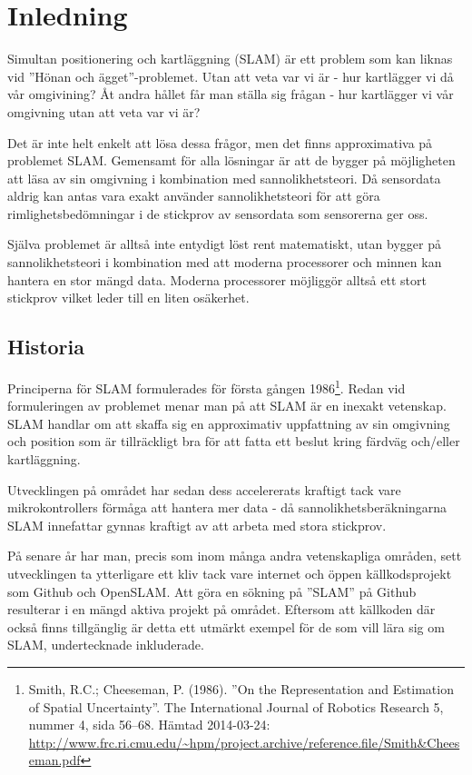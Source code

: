 \documentclass[a4paper,12pt,fleqn]{article} \usepackage{fixltx2e}
\begin{document}
\section{Inledning}

Simultan positionering och kartläggning (SLAM) är ett problem som kan liknas vid ''Hönan och ägget''-problemet. Utan att veta var vi är - hur kartlägger vi då vår omgivining? Åt andra hållet får man ställa sig frågan - hur kartlägger vi vår omgivning utan att veta var vi är? 

Det är inte helt enkelt att lösa dessa frågor, men det finns
approximativa på problemet SLAM. Gemensamt för alla lösningar är att de
bygger på möjligheten att läsa av sin omgivning i kombination med
sannolikhetsteori. Då sensordata aldrig kan antas vara exakt använder
sannolikhetsteori för att göra rimlighetsbedömningar i de stickprov av
sensordata som sensorerna ger oss.

Själva problemet är alltså inte entydigt löst rent matematiskt, utan
bygger på sannolikhetsteori i kombination med att moderna processorer
och minnen kan hantera en stor mängd data. Moderna processorer möjliggör
alltså ett stort stickprov vilket leder till en liten osäkerhet.

\subsection{Historia}

Principerna för SLAM formulerades för första gången 1986\footnote{Smith, R.C.; Cheeseman, P. (1986). ''On the Representation and Estimation of Spatial Uncertainty''. The International Journal of Robotics Research 5, nummer 4, sida 56–68. Hämtad 2014-03-24: \url{http://www.frc.ri.cmu.edu/~hpm/project.archive/reference.file/Smith&Cheeseman.pdf}}. Redan vid formuleringen av problemet menar man på att SLAM är en inexakt vetenskap. SLAM handlar om att skaffa sig en approximativ uppfattning av sin omgivning och position som är tillräckligt bra för att fatta ett beslut kring färdväg och/eller kartläggning. 

Utvecklingen på området har sedan dess accelererats kraftigt tack vare
mikrokontrollers förmåga att hantera mer data - då
sannolikhetsberäkningarna SLAM innefattar gynnas kraftigt av att arbeta
med stora stickprov.

På senare år har man, precis som inom många andra vetenskapliga områden, sett utvecklingen ta ytterligare ett kliv tack vare internet och öppen källkodsprojekt som Github och OpenSLAM. Att göra en sökning på ''SLAM'' på Github resulterar i en mängd aktiva projekt på området. Eftersom att källkoden där också finns tillgänglig är detta ett utmärkt exempel för de som vill lära sig om SLAM, undertecknade inkluderade. 
\end{document}
